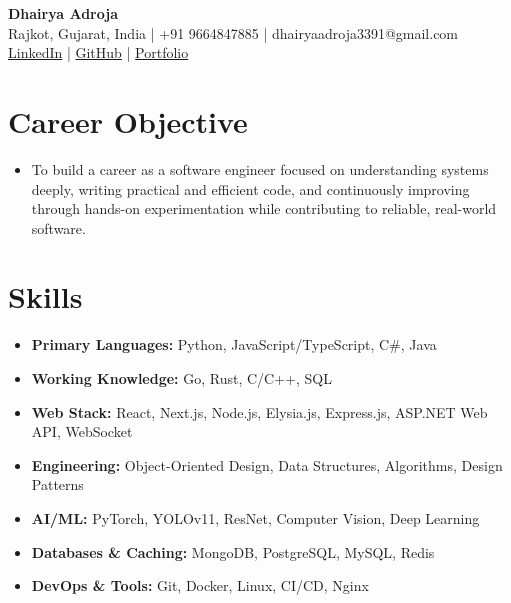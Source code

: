 \documentclass[11pt,a4paper]{article}
\begin{document}
\begin{center}
    {\huge \textbf{Dhairya Adroja}} \\
    \vspace{6pt}
    \small Rajkot, Gujarat, India | +91 9664847885 | dhairyaadroja3391@gmail.com \\
    \small \href{https://www.linkedin.com/in/adrojadhairya}{LinkedIn} | \href{https://github.com/Dhairya3391}{GitHub} | \href{https://pow.noobokay.me}{Portfolio}
\end{center}

\section{Career Objective}
\begin{itemize}[leftmargin=*]
\item To build a career as a software engineer focused on understanding systems deeply, writing practical and efficient code, and continuously improving through hands-on experimentation while contributing to reliable, real-world software.
\end{itemize}

\section{Skills}
\begin{itemize}[leftmargin=*]
\item \textbf{Primary Languages:} Python, JavaScript/TypeScript, C\#, Java
\item \textbf{Working Knowledge:} Go, Rust, C/C++, SQL
\item \textbf{Web Stack:} React, Next.js, Node.js, Elysia.js, Express.js, ASP.NET Web API, WebSocket
\item \textbf{Engineering:} Object-Oriented Design, Data Structures, Algorithms, Design Patterns
\item \textbf{AI/ML:} PyTorch, YOLOv11, ResNet, Computer Vision, Deep Learning
\item \textbf{Databases \& Caching:} MongoDB, PostgreSQL, MySQL, Redis
\item \textbf{DevOps \& Tools:} Git, Docker, Linux, CI/CD, Nginx
\end{itemize}

\end{document}
